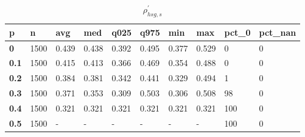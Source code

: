 \begin{table}[h]
 \centering 
\footnotesize
\caption{$\rho_{hsg,s}^\prime $}
\label{tab:alphahsgs}
\begin{tabular}[h]{|l|l|l|l|l|l|l|l|l|l|
    } \hline
\textbf{ p} & \textbf{ n} & \textbf{ avg} & \textbf{ med} & \textbf{ q025} & \textbf{ q975} & \textbf{ min} & \textbf{ max} & \textbf{ pct\_0} & \textbf{ pct\_nan}
    \\ \hline
  \textbf{  0} & 1500 & 0.439 & 0.438 & 0.392 & 0.495 & 0.377 & 0.529 &   0 & 0
    \\ \hline
  \textbf{0.1} & 1500 & 0.415 & 0.413 & 0.366 & 0.469 & 0.354 & 0.488 &   0 & 0
    \\ \hline
  \textbf{0.2} & 1500 & 0.384 & 0.381 & 0.342 & 0.441 & 0.329 & 0.494 &   1 & 0
    \\ \hline
  \textbf{0.3} & 1500 & 0.371 & 0.353 & 0.309 & 0.503 & 0.306 & 0.508 &  98 & 0
    \\ \hline
  \textbf{0.4} & 1500 & 0.321 & 0.321 & 0.321 & 0.321 & 0.321 & 0.321 & 100 & 0
    \\ \hline
  \textbf{0.5} & 1500 & - & - & - & - & - & - & 100 & 0
    \\ \hline
 \end{tabular}
 \end{table}
